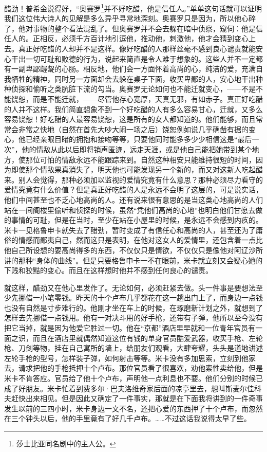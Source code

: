 \par 醋劲！普希金说得好，“奥赛罗\footnote{莎士比亚同名剧中的主人公。}并不好吃醋，他是信任人。”单单这句话就可以证明我们这位伟大诗人的见解是多么异乎寻常地深刻。奥赛罗只是因为，所以他心碎了，他对事物的整个看法混乱了。但奥赛罗并不会去躲在暗中侦察，窥伺：他是信任人的。正相反，必须千方百计地引逗他，推动他，刺激他，他才会猜到变心上去。真正好吃醋的人却并不是这样。像好吃醋的人那样丝毫不感到良心谴责就能安心干出一切可耻和败德的行为，说起来简直是令人难于想象的。这些人并不一定都有一副卑鄙龌龊的心肠。相反地，他们会一方面怀着高尚的心，纯洁的爱，充满自我牺牲的精神，同时另一方面却会去躲在桌子下面，收买卑鄙的人，安心地干出种种侦探和偷听之类肮脏下流的勾当。奥赛罗无论如何也不能迁就变心，——不是不能饶恕，而是不能迁就，——尽管他存心宽厚，天真无邪，有如赤子。真正好吃醋的人并不这样。我们简直想象不到一个好吃醋的人有多么容易甘心，迁就，又多么容易饶恕！好吃醋的人最容易饶恕，这是所有的女人都知道的。他们能够，而且常常会非常之快地（自然在首先大吵大闹一场之后）饶恕例如说几乎确凿有据的变心，他已经亲眼目睹的拥抱和接吻等等，只要他同时能多多少少相信这是“最后一次”，他的情敌从此以后即将销声匿迹，远走天涯，或是他自己能把她带到某个地方，使那位可怕的情敌永远不能跟踪来到。自然这种相安只能维持很短的时间，因为即使那个情敌果真消失了，明天他也可能发现另一个新的，而又对这新人吃起醋来。别人会觉得，那种必须加以监视的爱情究竟有什么意思？那种必须尽力看守的爱情究竟有什么价值？但是真正好吃醋的人是永远不会明了这层的，可是说实话，他们中间甚至也不乏心地高尚的人。还有说来很有意思的是当这类心地高尚的人们站在一间阁楼里偷听和侦探的时候，虽然“凭他们高尚的心地”也明白他们甘愿去做的事情的可耻，但是在当时，至少在站在小屋里的时候，是永远不会感到内疚的。米卡一见格鲁申卡就失去了醋劲，暂时变成了有信任心和高尚的人，甚至还为了庸俗的情感而鄙夷自己，然而这只是表明，在他对这女人的爱情里，还包含着一点比他自己所设想的要高尚得多的东西，不仅仅只是情欲，不仅仅只是像他对阿辽沙所讲的那种“身体的曲线”。但是只要格鲁申卡一不在眼前，米卡就立刻又会疑心她的下贱和狡黠的变心。而且在这样想时他并不感到任何良心的谴责。
\par 就这样，醋劲又在他心里发作了。无论如何，必须赶紧去做。头一件事是要想法至少先挪借一小笔零钱。昨天的十个卢布几乎都花在这一趟出门上了，而身边一点钱也没有自然是寸步难行的。他刚才坐在车上的时候，在琢磨新计划之外，就想到了怎样去先挪借一点钱用。他有一对决斗用的好手枪，还带有子弹，他所以至今没有把它当掉，就是因为他爱它胜过一切。他在“京都”酒店里早就和一位青年官员有一面之识，而且在酒店里就偶然知道这位有钱的单身官员酷爱武器，收买手枪、左轮枪、刀剑等物，挂在自己寓所的墙上，给朋友们观看，大肆夸耀，头头是道地讲述左轮手枪的型号，怎样装子弹，如何射击等等。米卡没有多加思索，立刻到他家去，请求把他的手枪抵押十个卢布。那位官员看了很喜欢，劝他索性卖给他，但是米卡不肯答应。官员给了他十个卢布，声明他一点利息也不要。他们分别的时候已成了好朋友。米卡忙着到费多尔·巴夫洛维奇家后面的凉亭里去，想叫斯麦尔佳科夫赶快出来相见。但是因此又确定了一件事实，那就是在下面我将讲到的一件奇事发生以前的三四小时，米卡身边一文不名，还把心爱的东西押了十个卢布，而忽然在三个钟头以后，他的手里竟有了好几千卢布。……不过这话我说得太早了些。
